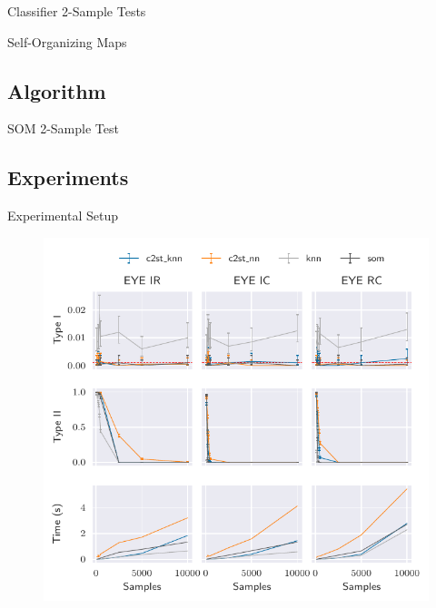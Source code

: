 \documentclass[10pt]{beamer}
\begin{document}
\begin{frame}{Classifier 2-Sample Tests}
\end{frame}

\begin{frame}{Self-Organizing Maps}
\end{frame}

\subsection{Algorithm}

\begin{frame}{SOM 2-Sample Test}
\end{frame}

\subsection{Experiments}

\begin{frame}{Experimental Setup}
    
\end{frame}

\begin{frame}{}
\begin{figure}
    \centering
    \includegraphics[height=\textheight]{eye.pdf}
\end{figure}
\end{frame}
\end{document}
